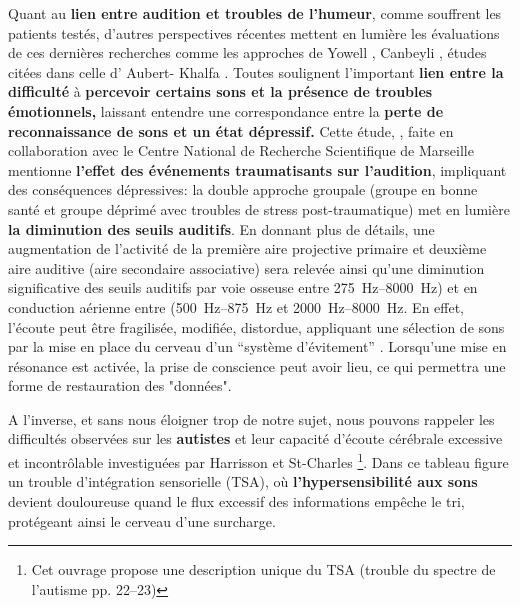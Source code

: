 Quant au \textbf{ lien entre audition et troubles de l'humeur}, comme souffrent
les patients testés, d'autres perspectives
récentes mettent en lumière les évaluations de ces dernières recherches  comme les approches de 
Yowell \autocite {Yowell}, %
 Canbeyli \autocite{Canbeyli},
études citées dans celle d' Aubert- Khalfa \autocite {affectiveDisorders}. Toutes soulignent
l'important\textbf{ lien entre la difficulté}
à \textbf {percevoir certains sons et la présence de troubles émotionnels,}
laissant entendre une correspondance 
entre la \textbf {perte de reconnaissance de
sons et un état dépressif.}
Cette étude, \autocite{affectiveDisorders}, faite
   en collaboration avec
le Centre National de Recherche Scientifique de Marseille
 mentionne \textbf{l'effet des événements
traumatisants sur l'audition}, impliquant des conséquences dépressives:
la double approche groupale (groupe en bonne santé et groupe déprimé avec
troubles de stress post-traumatique) met en lumière \textbf{la diminution des
  seuils auditifs}.
En donnant plus de détails, une augmentation de l'activité de la
première aire projective primaire et deuxième aire auditive (aire
secondaire associative) sera relevée ainsi qu'une 
diminution significative des
seuils auditifs par voie osseuse  entre
\SIrange{275}{8000}{\Hz}) et en conduction aérienne entre 
(\SIrange{500}{875}{\Hz} et  \SIrange{2000}{8000}{\Hz}.
En effet, l'écoute peut être fragilisée, modifiée, distordue, appliquant une sélection de sons par la mise en 
place du cerveau d'un \enquote{système d'évitement} \autocite {Kabat-Zinn}.
Lorsqu'une mise en résonance est activée, la prise de conscience peut avoir lieu, ce qui permettra une 
forme de restauration des "données".

A l'inverse, et sans nous éloigner trop de notre sujet, nous pouvons rappeler
les difficultés observées sur les
\textbf{autistes} et leur capacité d'écoute cérébrale excessive et
incontrôlable investiguées par Harrisson et St-Charles \autocite {harrisson_autisme_2017}\footnote{Cet ouvrage propose une description unique du TSA
   (trouble du spectre de l'autisme
   pp. 22--23)}. Dans ce tableau
 figure un trouble d'intégration sensorielle (TSA), où
 \textbf{l'hypersensibilité aux sons} devient douloureuse quand le flux excessif
 des
 informations empêche le tri, protégeant ainsi le cerveau d'une surcharge.

